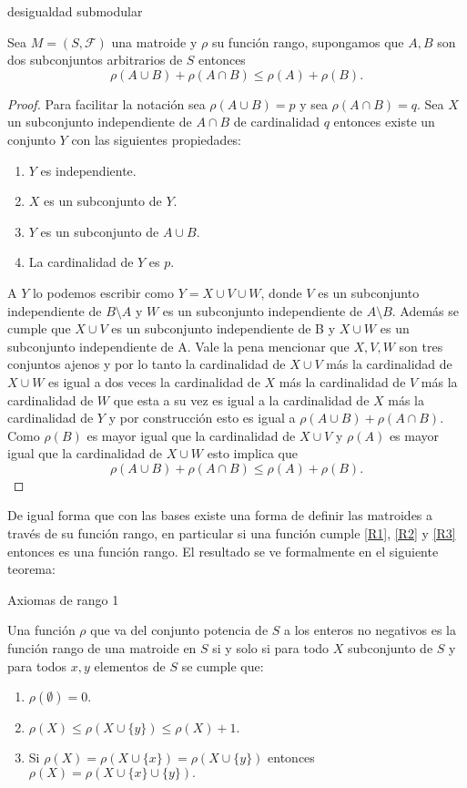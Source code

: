\begin{cor} {desigualdad submodular} \label {R3'}

Sea $M=(S,\mathcal{F})$ una matroide y $\rho$ su función rango, supongamos que $A,B$ son dos subconjuntos arbitrarios de $S$ entonces
$$\rho(A \cup B)+ \rho(A \cap B) \leq \rho(A) + \rho(B).$$
\end{cor}

\begin{proof}
Para facilitar la notación sea $\rho(A \cup B)=p$ y sea $\rho(A \cap B) =q$. Sea $X$ un subconjunto independiente de $A \cap B$ de cardinalidad $q$ entonces existe un conjunto $Y$ con las siguientes propiedades:
\begin{enumerate}
\item $Y$ es independiente.
\item $X$ es un subconjunto de $Y$.
\item $Y$ es un subconjunto de $A \cup B$.
\item La cardinalidad de $Y$ es $p$.
\end{enumerate}
A $Y$ lo podemos escribir como $Y=X \cup V \cup W$, donde $V$ es un subconjunto independiente de $B \setminus A$ y $W$ es un subconjunto independiente de $A \setminus B$. Además se cumple que $X \cup V$ es un subconjunto independiente de B y $X \cup W$ es un subconjunto independiente de A. Vale la pena mencionar que $X, V,W$ son tres conjuntos ajenos y por lo tanto la cardinalidad de $X \cup V$ más la cardinalidad de $X \cup W$ es igual a dos veces la cardinalidad de $X$ más la cardinalidad de $V$ más la cardinalidad de $W$ que esta a su vez es igual a la cardinalidad de $X$ más la cardinalidad de $Y$ y por construcción esto es igual a $\rho(A \cup B)+ \rho(A \cap B)$. \\
Como $\rho(B)$ es mayor igual que la cardinalidad de $X \cup V$ y $\rho(A)$ es mayor igual que la cardinalidad de $X \cup W$ esto implica que 
$$\rho(A \cup B)+ \rho(A \cap B) \leq \rho(A) + \rho(B).$$
\end{proof}

De igual forma que con las bases existe una forma de definir las matroides a través de su función rango, en particular si una función cumple \ref{R1}, \ref{R2} y \ref{R3} entonces es una función rango. El resultado se ve formalmente en el siguiente teorema:

\begin{teo}{Axiomas de rango 1} \label{rank 1}

Una función $\rho$ que va del conjunto potencia de $S$ a los enteros no negativos es la función rango de una matroide en $S$ si y solo si para todo $X$ subconjunto de $S$ y para todos $x,y$ elementos de $S$ se cumple que:
\begin{enumerate}
\item $\rho(\emptyset) =0.$
\item $\rho(X) \leq \rho(X \cup \{y\}) \leq \rho(X)+1.$
\item Si $\rho(X)=\rho(X \cup \{ x\}) =\rho(X \cup \{ y\}) $ entonces $\rho(X)=\rho(X \cup \{ x\} \cup \{ y\}).$
\end{enumerate}
\end{teo}

